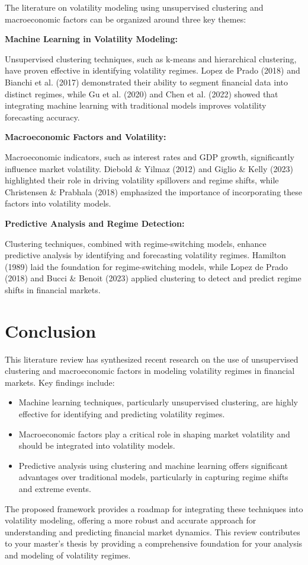 The literature on volatility modeling using unsupervised clustering and macroeconomic factors can be organized around three key themes:

\textbf{Machine Learning in Volatility Modeling:}

Unsupervised clustering techniques, such as k-means and hierarchical clustering, have proven effective in identifying volatility regimes. Lopez de Prado (2018) \cite{lopez_de_prado_2018} and Bianchi et al. (2017) demonstrated their ability to segment financial data into distinct regimes, while Gu et al. (2020) and Chen et al. (2022) showed that integrating machine learning with traditional models improves volatility forecasting accuracy.

\textbf{Macroeconomic Factors and Volatility:}

Macroeconomic indicators, such as interest rates and GDP growth, significantly influence market volatility. Diebold \& Yilmaz (2012) \cite{diebold_yilmaz_2012} and Giglio \& Kelly (2023) \cite{giglio_kelly_2023} highlighted their role in driving volatility spillovers and regime shifts, while Christensen \& Prabhala (2018) emphasized the importance of incorporating these factors into volatility models.

\textbf{Predictive Analysis and Regime Detection:}

Clustering techniques, combined with regime-switching models, enhance predictive analysis by identifying and forecasting volatility regimes. Hamilton (1989) \cite{hamilton_markov_1989} laid the foundation for regime-switching models, while Lopez de Prado (2018) \cite{lopez_de_prado_2018} and Bucci \& Benoit (2023) applied clustering to detect and predict regime shifts in financial markets.

\section{Conclusion}

This literature review has synthesized recent research on the use of unsupervised clustering and macroeconomic factors in modeling volatility regimes in financial markets. Key findings include:
\begin{itemize}

\item Machine learning techniques, particularly unsupervised clustering, are highly effective for identifying and predicting volatility regimes.
\item Macroeconomic factors play a critical role in shaping market volatility and should be integrated into volatility models.
\item Predictive analysis using clustering and machine learning offers significant advantages over traditional models, particularly in capturing regime shifts and extreme events.
\end{itemize}
The proposed framework provides a roadmap for integrating these techniques into volatility modeling, offering a more robust and accurate approach for understanding and predicting financial market dynamics. This review contributes to your master's thesis by providing a comprehensive foundation for your analysis and modeling of volatility regimes.

